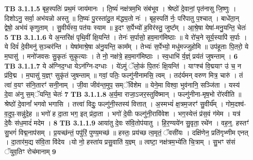 \documentclass[17pt]{extarticle}
\begin{document}
                  \newline
                                \textbf{ TB 3.1.1.5} \newline
                  बृह॒स्पतिः॑ प्रथ॒मं जाय॑मानः । ति॒ष्यं॑ नक्ष॑त्रम॒भि संब॑भूव । श्रेष्ठो॑ दे॒वानां॒ पृत॑नासु जि॒ष्णुः । दिशोऽनु॒ सर्वा॒ अभ॑यन्नो अस्तु ॥ ति॒ष्यः॑ पु॒रस्ता॑दु॒त म॑द्ध्य॒तो नः॑ । बृह॒स्पति॑ र्नः॒ परि॑पातु प॒श्चात् । बाधे॑ता॒न् द्वेषो॒ अभ॑यं कृणुताम् । सु॒वीर्य॑स्य॒ पत॑यः स्याम ॥ इ॒दꣳ स॒र्पेभ्यो॑ ह॒विर॑स्तु॒ जुष्ट᳚म् । आ॒श्रे॒षा येषा॑-मनु॒यन्ति॒ चेतः॑ \textbf{ 5} \newline
                  \newline
                                \textbf{ TB 3.1.1.6} \newline
                  ये अ॒न्तरि॑क्षं पृथि॒वीं क्षि॒यन्ति॑ । तेनः॑ स॒र्पासो॒ हव॒माग॑मिष्ठाः ॥ ये रो॑च॒ने सूर्य॒स्यापि॑ स॒र्पाः । ये दिवं॑ दे॒वीमनु॑ स॒ञ्चर॑न्ति । येषा॑माश्रे॒षा अ॑नु॒यन्ति॒ काम᳚म् । तेभ्यः॑ स॒र्पेभ्यो॒ मधु॑मज्जुहोमि ॥ उप॑हूताः पि॒तरो॒ ये म॒घासु॑ । मनो॑जवसः सु॒कृतः॑ सुकृ॒त्याः । ते नो॒ नक्ष॑त्रे॒ हव॒माग॑मिष्ठाः । स्व॒धाभि॑ र्य॒ज्ञ्ं प्रय॑तं जुषन्ताम् । \textbf{ 6} \newline
                  \newline
                                \textbf{ TB 3.1.1.7} \newline
                  ये अ॑ग्निद॒ग्धा येऽन॑ग्नि-दग्धाः । ये॑ऽमुं ॅलो॒कं पि॒तरः॑ क्षि॒यन्ति॑ । याꣳश्च॑ वि॒द्मयाꣳ उ॑ च॒ न प्र॑वि॒द्म । म॒घासु॑ य॒ज्ञ्ꣳ सुकृ॑तं जुषन्ताम् ॥ गवां॒ पतिः॒ फल्गु॑नीनामसि॒ त्वम् । तद॑र्यमन् वरुण मित्र॒ चारु॑ । तं त्वा॑ व॒यꣳ स॑नि॒तारꣳ॑ सनी॒नाम् । जी॒वा जीव॑न्त॒मुप॒ सम्ॅवि॑शेम ॥ येने॒मा विश्वा॒ भुव॑नानि॒ सञ्जि॑ता । यस्य॑ दे॒वा अ॑नु स॒म्ॅयन्ति॒ चेतः॑ \textbf{ 7} \newline
                  \newline
                                \textbf{ TB 3.1.1.8} \newline
                  अ॒र्य॒मा राजा॒ऽजर॒स्तुवि॑ष्मान् । फल्गु॑नीना-मृष॒भो रो॑रवीति ॥ श्रेष्ठो॑ दे॒वानां᳚ भगवो भगासि । तत्त्वा॑ विदुः॒ फल्गु॑नी॒स्तस्य॑ वित्तात् । अ॒स्मभ्यं॑ क्ष॒त्रम॒जरꣳ॑ सु॒वीर्य᳚म् । गोम॒दश्व॑-व॒दुप॒-सन्नु॑दे॒ह ॥ भगो॑ ह दा॒ता भग॒ इत् प्र॑दा॒ता । भगो॑ दे॒वीः फल्गु॑नी॒रावि॑वेश । भग॒स्येत्तं प्र॑स॒वं ग॑मेम । यत्र॑ दे॒वैः स॑ध॒मादं॑ मदेम । \textbf{ 8} \newline
                  \newline
                                \textbf{ TB 3.1.1.9} \newline
                  आया॑तु दे॒वः स॑वि॒तोप॑यातु । हि॒र॒ण्यये॑न सु॒वृता॒ रथे॑न । वह॒न्॒. हस्तꣳ॑ सु॒भगं॑ विद्म॒नाप॑सम् । प्र॒यच्छ॑न्तं॒ पपु॑रिं॒ पुण्य॒मच्छ॑ ॥ हस्तः॒ प्रय॑च्छ त्व॒मृतं॒ ॅवसी॑यः । दक्षि॑णेन॒ प्रति॑गृभ्णीम एनत् । दा॒तार॑म॒द्य स॑वि॒ता वि॑देय ।यो नो॒ हस्ता॑य प्रसु॒वाति॑ य॒ज्ञ्म् ॥ त्वष्टा॒ नक्ष॑त्रम॒भ्ये॑ति चि॒त्राम् । सु॒भꣳ स॑सं ॅयुव॒तिꣳ रोच॑मानाम् \textbf{ 9} \newline
\end{document}
